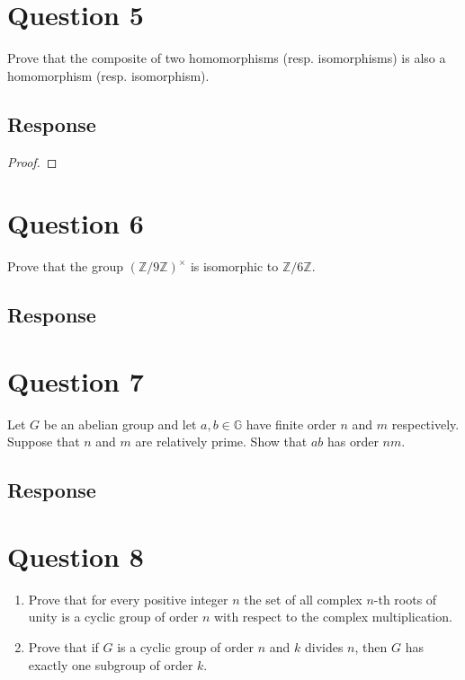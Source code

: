 \documentclass[13pt]{article}
\begin{document}
\newpage
\section*{Question 5}
Prove that the composite of two homomorphisms (resp. isomorphisms) is also a homomorphism
(resp. isomorphism).

\subsection*{Response}
\begin{proof}
\end{proof}





\newpage
\section*{Question 6}
Prove that the group $(\mathbb{Z}/9\mathbb{Z})^{\times}$ is isomorphic to $\mathbb{Z}/6\mathbb{Z}$.

\subsection*{Response}





\newpage
\section*{Question 7}
Let $G$ be an abelian group and let $a, b \in \mathbb{G}$ have finite order $n$ and $m$
respectively. Suppose that $n$ and $m$ are relatively prime. Show that $ab$ has order $nm$.

\subsection*{Response}





\newpage
\section*{Question 8}
\begin{enumerate}[label=(\alph*)]
\item Prove that for every positive integer $n$ the set of all complex $n$-th roots of unity is a
  cyclic group of order $n$ with respect to the complex multiplication.
\item Prove that if $G$ is a cyclic group of order $n$ and $k$ divides $n$, then $G$ has exactly one
  subgroup of order $k$.
\end{enumerate}
\end{document}
